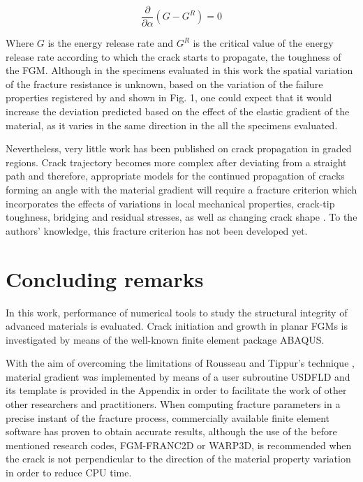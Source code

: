 \begin{equation}
\frac{\partial}{\partial \alpha}(G-G^R)=0
\end{equation}

Where $G$ is the energy release rate and $G^R$ is the critical value of the energy release rate according to which the crack starts to propagate, the toughness of the FGM. Although in the specimens evaluated in this work the spatial variation of the fracture resistance is unknown, based on the variation of the failure properties registered by \cite{Abanto-Bueno2006} and shown in Fig. 1, one could expect that it would increase the deviation predicted based on the effect of the elastic gradient of the material, as it varies in the same direction in the all the specimens evaluated.

Nevertheless, very little work has been published on crack propagation in graded regions. Crack trajectory becomes more complex after deviating from a straight path and therefore, appropriate models for the continued propagation of cracks forming an angle with the material gradient will require a fracture criterion which incorporates the effects of variations in local mechanical properties, crack-tip toughness, bridging and residual stresses, as well as changing crack shape \citep{Tilbrook2005b}. To the authors' knowledge, this fracture criterion has not been developed yet.

\section{Concluding remarks}
\label{}

In this work, performance of numerical tools to study the structural integrity of advanced materials is evaluated. Crack initiation and growth in planar FGMs is investigated by means of the well-known finite element package ABAQUS.

With the aim of overcoming the limitations of Rousseau and Tippur's technique \citep{Rousseau2000}, material gradient was implemented by means of a user subroutine USDFLD and its template is provided in the Appendix in order to facilitate the work of other other researchers and practitioners. When computing fracture parameters in a precise instant of the fracture process, commercially available finite element software has proven to obtain accurate results, although the use of the before mentioned research codes, FGM-FRANC2D or WARP3D, is recommended when the crack is not perpendicular to the direction of the material property variation in order to reduce CPU time.

